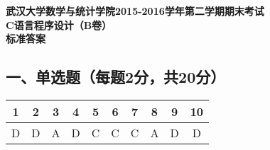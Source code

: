 \documentclass[8pt]{article}
\newlength{\la}
\newlength{\ld}
\begin{document}
\begin{CJK}{UTF8}{gkai}
\begin{center}
{\Large \bf  武汉大学数学与统计学院2015-2016学年第二学期期末考试\\[0.1in]C语言程序设计（B卷）\\[0.1in]标准答案} \vspace{0.1in}


\end{center}



\subsection*{一、单选题（每题2分，共20分）}

\begin{table}[htbp]
\centering
\begin{tabular}{|c|c|c|c|c|c|c|c|c|c|}\hline
1&2&3&4&5&6&7&8&9&10\\\hline
D&D&A&D&C&C&C&A&D&D \\\hline
\end{tabular}
\end{table}



\end{CJK}
\end{document}

